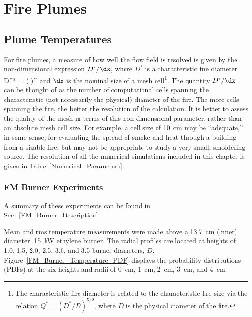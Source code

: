 
\chapter{Fire Plumes}

\section{Plume Temperatures}

For fire plumes, a measure of how well the flow field is resolved is given by the non-dimensional expression $D^*/\dx$, where $D^*$ is a characteristic
fire diameter
\be
   D^* = \left(
     \right)^
\ee
and $\dx$ is the nominal size of a mesh cell\footnote{The characteristic fire diameter is related to the characteristic fire size via the relation $Q^* = (D^*/D)^{5/2}$, where $D$ is the physical diameter of the fire.}. The quantity $D^*/\dx$ can be thought of as the number of computational cells spanning the characteristic (not necessarily the physical) diameter of the fire. The more cells spanning the fire, the better the resolution of the calculation. It is better to assess the quality of the mesh in terms of this non-dimensional parameter, rather than an absolute mesh cell size. For example, a cell size of 10~cm may be ``adequate,'' in some sense, for evaluating the spread of smoke and heat through a building from a sizable fire, but may not be appropriate to study a very small, smoldering source. The resolution of all the numerical simulations included in this chapter is given in Table~\ref{Numerical_Parameters}.

\clearpage

\subsection{FM Burner Experiments}
\label{FM_Burner_Plume_Temperature}

A summary of these experiments can be found in Sec.~\ref{FM_Burner_Description}.

Mean and rms temperature measurements were made above a 13.7~cm (inner) diameter, 15~kW ethylene burner. The radial profiles are located at heights of 1.0, 1.5, 2.0, 2.5, 3.0, and 3.5 burner diameters, $D$. Figure~\ref{FM_Burner_Temperature_PDF} displays the probability distributions (PDFs) at the six heights and radii of 0~cm, 1~cm, 2~cm, 3~cm, and 4~cm.

